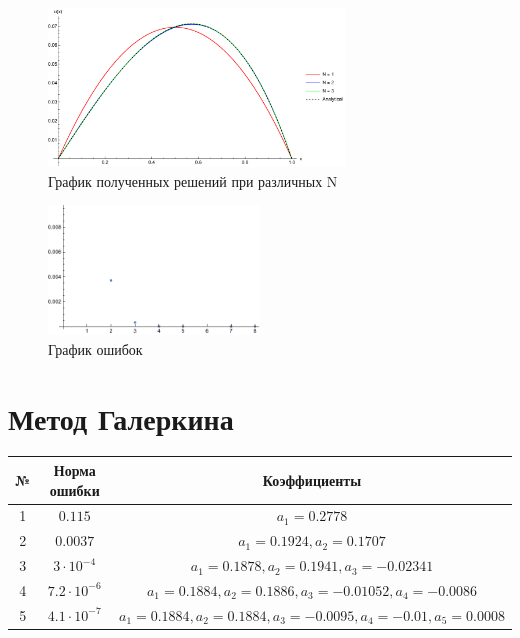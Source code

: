 \documentclass[12pt,a4paper]{article}
\begin{document}
    \begin{figure}[h]
        \centering
        \includegraphics[width=0.7\textwidth]{3.pdf}
        \caption{График полученных решений при различных N}
    \end{figure}
    \begin{figure}[h]
        \centering
        \includegraphics[width=0.5\textwidth]{3_error.pdf}
        \caption{График ошибок}
    \end{figure}

    \pagebreak

    \section{ Метод Галеркина}

    \begin{center}
        \begin{tabular}{|c|c|c|} 
         \hline
         № & Норма ошибки & Коэффициенты \\ 
         \hline
         1 & $0.115$ & $a_1=0.2778$ \\ 
         \hline
         2 & $0.0037$ & $a_1=0.1924, a_2=0.1707$ \\ 
         \hline
         3 & $3\cdot10^{-4}$ & $a_1=0.1878, a_2=0.1941, a_3=-0.02341$ \\ 
         \hline
         4 & $7.2\cdot10^{-6}$ & $a_1=0.1884, a_2=0.1886, a_3=-0.01052, a_4=-0.0086$ \\ 
         \hline
         5 & $4.1\cdot10^{-7}$ & $a_1=0.1884, a_2=0.1884, a_3=-0.0095, a_4=-0.01, a_5=0.0008$ \\ 
         \hline
        \end{tabular}
    \end{center}
\end{document}
